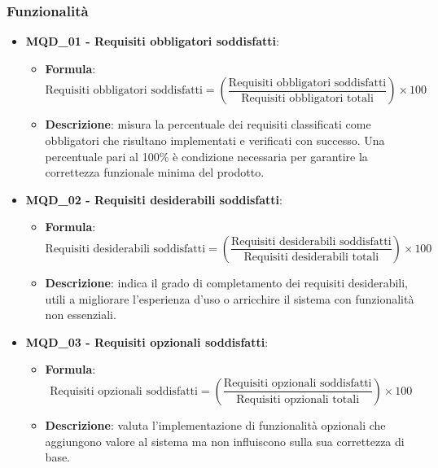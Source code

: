 \subsubsection{Funzionalità}
\begin{itemize}
\item \textbf{MQD\_01 - Requisiti obbligatori soddisfatti}:
    \begin{itemize}
        \item \textbf{Formula}:
        \[
            \text{Requisiti obbligatori soddisfatti} = 
            \left(
                \frac{\text{Requisiti obbligatori soddisfatti}}
                     {\text{Requisiti obbligatori totali}}
            \right) \times 100
        \]
        \item \textbf{Descrizione}: misura la percentuale dei requisiti classificati come obbligatori che risultano implementati e verificati con successo. Una percentuale pari al 100\% è condizione necessaria per garantire la correttezza funzionale minima del prodotto.
    \end{itemize}

\item \textbf{MQD\_02 - Requisiti desiderabili soddisfatti}:
    \begin{itemize}
        \item \textbf{Formula}:
        \[
			\text{Requisiti desiderabili soddisfatti} =
            \left(
                \frac{\text{Requisiti desiderabili soddisfatti}}
                     {\text{Requisiti desiderabili totali}}
            \right) \times 100
        \]
        \item \textbf{Descrizione}: indica il grado di completamento dei requisiti desiderabili, utili a migliorare l’esperienza d’uso o arricchire il sistema con funzionalità non essenziali.
    \end{itemize}

\item \textbf{MQD\_03 - Requisiti opzionali soddisfatti}:
    \begin{itemize}
        \item \textbf{Formula}:
        \[
			\text{Requisiti opzionali soddisfatti} =
            \left(
                \frac{\text{Requisiti opzionali soddisfatti}}
                     {\text{Requisiti opzionali totali}}
            \right) \times 100
        \]
        \item \textbf{Descrizione}: valuta l’implementazione di funzionalità opzionali che aggiungono valore al sistema ma non influiscono sulla sua correttezza di base.
    \end{itemize}
\end{itemize}

